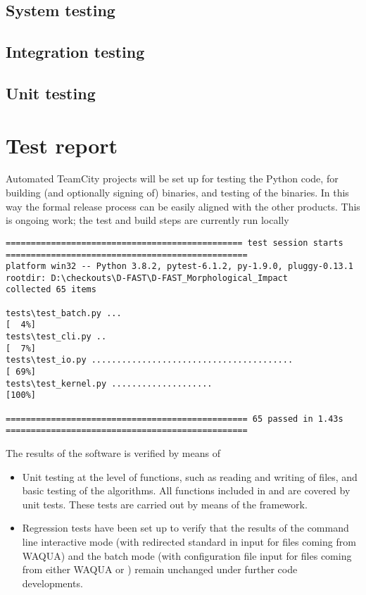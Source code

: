 \subsection{System testing}

\subsection{Integration testing}

\subsection{Unit testing}

\section{Test report}

Automated TeamCity projects will be set up for testing the Python code, for building (and optionally signing of) binaries, and testing of the binaries.
In this way the formal release process can be easily aligned with the other products.
This is ongoing work; the test and build steps are currently run locally

\begin{Verbatim}[fontsize=\tiny]
=============================================== test session starts ================================================
platform win32 -- Python 3.8.2, pytest-6.1.2, py-1.9.0, pluggy-0.13.1
rootdir: D:\checkouts\D-FAST\D-FAST_Morphological_Impact
collected 65 items

tests\test_batch.py ...                                                                                       [  4%]
tests\test_cli.py ..                                                                                          [  7%]
tests\test_io.py ........................................                                                     [ 69%]
tests\test_kernel.py ....................                                                                     [100%]

================================================ 65 passed in 1.43s ================================================
\end{Verbatim}

The results of the software is verified by means of

\begin{itemize}
\item Unit testing at the level of functions, such as reading and writing of files, and basic testing of the algorithms.
All functions included in  and  are covered by unit tests.
These tests are carried out by means of the  framework.
\item Regression tests have been set up to verify that the results of the command line interactive mode (with redirected standard in input for files coming from WAQUA) and the batch mode (with configuration file input for files coming from either WAQUA or \dflowfm) remain unchanged under further code developments.
\end{itemize}

